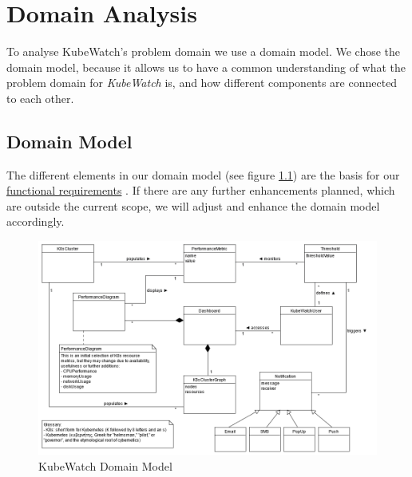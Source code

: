 \chapter{Domain Analysis}


To analyse KubeWatch's problem domain we use a domain model. We chose the domain model, because it allows us to have a common understanding of what the problem domain for \textit{KubeWatch} is, and how different components are connected to each other.

\section{Domain Model}
The different elements in our domain model (see figure \ref{fig:domain-model}) are the basis for our \hyperref[section:functional-requirements]{functional requirements} . If there are any further enhancements planned, which are outside the current scope, we will adjust and enhance the domain model accordingly.

\vspace{1cm}

\begin{figure}[h]
    \centering
    \caption{KubeWatch Domain Model}
    \label{fig:domain-model}
    \includegraphics[width=\textwidth]{resources/domain_model.png}
\end{figure}